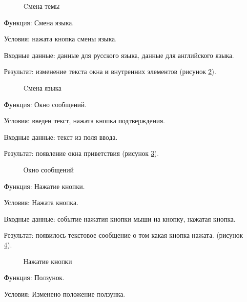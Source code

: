 \begin{figure}[H] %
\caption{Cмена темы}
\label{theme:image}
\end{figure}

Функция: Смена языка.

Условия: нажата кнопка смены языка.

Входные данные: данные для русского языка, данные для английского языка.

Результат: изменение текста окна и внутренних элементов (рисунок \ref{lang:image}).

\begin{figure}[H] %
	\caption{Cмена языка}
	\label{lang:image}
\end{figure}

Функция: Окно сообщений.

Условия: введен текст, нажата кнопка подтверждения.

Входные данные: текст из поля ввода.

Результат: появление окна приветствия (рисунок \ref{msg:image}).

\begin{figure}[H] %
	\caption{Окно сообщений}
	\label{msg:image}
\end{figure}

Функция: Нажатие кнопки.

Условия: Нажата кнопка.

Входные данные: событие нажатия кнопки мыши на кнопку, нажатая кнопка.

Результат: появилось текстовое сообщение о том какая кнопка нажата. (рисунок \ref{button:image}).

\begin{figure}[H] %
	\caption{Нажатие кнопки}
	\label{button:image}
\end{figure}

Функция: Ползунок.

Условия: Изменено положение ползунка.

